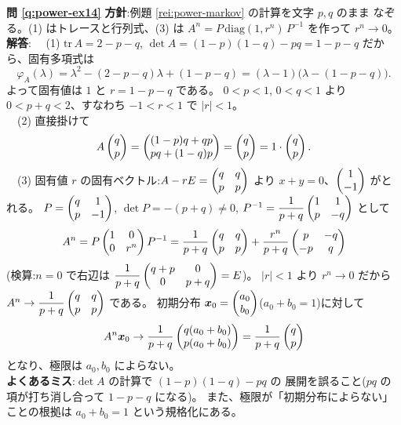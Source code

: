 \bigskip
\noindent\textbf{問 \ref{q:power-ex14}}\quad
\textbf{方針}:例題 \ref{rei:power-markov} の計算を文字 $p, q$ のまま
なぞる。(1) はトレースと行列式、(3) は
$A^n = P\,\mathrm{diag}(1, r^n)\,P^{-1}$ を作って $r^n \to 0$。\\
\textbf{解答}:
　(1) $\mathrm{tr}\,A = 2 - p - q$,
$\det A = (1 - p)(1 - q) - pq = 1 - p - q$ だから、固有多項式は
\[
\varphi_A(\lambda) = \lambda^2 - (2 - p - q)\lambda + (1 - p - q)
= (\lambda - 1)\bigl(\lambda - (1 - p - q)\bigr).
\]
よって固有値は $1$ と $r = 1 - p - q$ である。
$0 < p < 1$, $0 < q < 1$ より $0 < p + q < 2$、すなわち
$-1 < r < 1$ で $|r| < 1$。\\
　(2) 直接掛けて
\[
A\begin{pmatrix}q \\ p\end{pmatrix} = \begin{pmatrix}(1 - p)q + qp \\ pq + (1 - q)p\end{pmatrix} = \begin{pmatrix}q \\ p\end{pmatrix}
= 1 \cdot \begin{pmatrix}q \\ p\end{pmatrix}.
\]
　(3) 固有値 $r$ の固有ベクトル:$A - rE = \begin{pmatrix}q & q \\ p & p\end{pmatrix}$ より
$x + y = 0$、$\begin{pmatrix}1 \\ -1\end{pmatrix}$ がとれる。
$P = \begin{pmatrix}q & 1 \\ p & -1\end{pmatrix}$, $\det P = -(p + q) \neq 0$,
$P^{-1} = \dfrac{1}{p + q}\begin{pmatrix}1 & 1 \\ p & -q\end{pmatrix}$ として
\[
A^n = P\begin{pmatrix}1 & 0 \\ 0 & r^n\end{pmatrix}P^{-1}
= \frac{1}{p + q}\begin{pmatrix}q & q \\ p & p\end{pmatrix}
+ \frac{r^n}{p + q}\begin{pmatrix}p & -q \\ -p & q\end{pmatrix}
\]
(検算:$n = 0$ で右辺は
$\dfrac{1}{p + q}\begin{pmatrix}q + p & 0 \\ 0 & p + q\end{pmatrix} = E$)。
$|r| < 1$ より $r^n \to 0$ だから
$A^n \to \dfrac{1}{p + q}\begin{pmatrix}q & q \\ p & p\end{pmatrix}$ である。
初期分布 $\bm{x}_0 = \begin{pmatrix}a_0 \\ b_0\end{pmatrix}$($a_0 + b_0 = 1$)に対して
\[
A^n\bm{x}_0 \to \frac{1}{p + q}\begin{pmatrix}q(a_0 + b_0) \\ p(a_0 + b_0)\end{pmatrix}
= \frac{1}{p + q}\begin{pmatrix}q \\ p\end{pmatrix}
\]
となり、極限は $a_0, b_0$ によらない。\\
\textbf{よくあるミス}:$\det A$ の計算で $(1-p)(1-q) - pq$ の
展開を誤ること($pq$ の項が打ち消し合って $1 - p - q$ になる)。
また、極限が「初期分布によらない」ことの根拠は
$a_0 + b_0 = 1$ という規格化にある。

